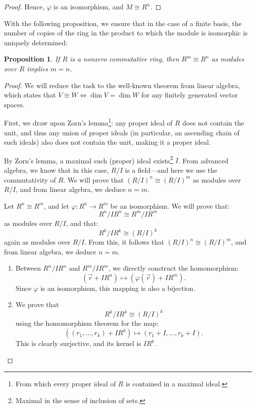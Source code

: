 \documentclass{article}
\newif\ifusemulticols
\theoremstyle{definition}
\theoremstyle{remark}
\theoremstyle{plain}
\theoremstyle{plain}
\newtheorem{prop}[theorem]{Proposition}
\newenvironment{mymulticols}
    { \ifusemulticols \begin{multicols}{2} \fi }
    { \ifusemulticols \end{multicols} \fi }
\begin{document}
\begin{mymulticols}
\begin{proof}
    Hence, $\varphi$ is an isomorphism, and $M \cong R^n$.
\end{proof}

With the following proposition, we ensure that in the case of a finite basis, the number of copies of the ring in the product to which the module is isomorphic is uniquely determined:

\begin{prop}
    \label{prop:commut_rank}
    If $R$ is a nonzero commutative ring, then $R^m \cong R^n$ as modules over $R$ implies $m = n$.
\end{prop}
\begin{proof}
    We will reduce the task to the well-known theorem from linear algebra, which states that $V
    \cong W \Leftrightarrow \dim V = \dim W$ for any finitely generated vector spaces.

    First, we draw upon Zorn's lemma\footnote{From which every proper ideal of $R$ is contained in a
    maximal ideal.}: any proper ideal of $R$ does not contain the unit, and thus any union of proper
    ideals (in particular, an ascending chain of such ideals) also does not contain the unit, making
    it a proper ideal.

    By Zorn's lemma, a maximal such (proper) ideal exists\footnote{Maximal in the sense of inclusion
    of sets.} $I$.
    From advanced algebra, we know that in this case, $R / I$ is a field—and here we use the
    commutativity of $R$.
    We will prove that $(R / I)^n \cong (R / I)^m$ as modules over $R / I$, and from linear algebra, we deduce $n = m$.

    Let $R^n \cong R^m$, and let $\varphi : R^n \to R^m$ 
    be an isomorphism. We will prove that: $${R^n}/{IR^n} \cong {R^m}/{IR^m}$$
    as modules over $R / I$, and that: $${R^k}/{IR^k} \cong \left(R / I\right)^k$$
    again as modules over $R / I$. From this, it follows that $\left(R / I\right)^n \cong \left(R / I\right)^m$, and from linear algebra, we deduce $n = m$.
    \begin{enumerate}
        \item Between ${R^n}/{IR^n}$ and ${R^m}/{IR^m}$, we directly construct the homomorphism:
            $$(\vec{r} + IR^n) \mapsto (\varphi(\vec{r}) + IR^m).$$
            Since $\varphi$ is an isomorphism, this mapping is also a bijection.
        \item We prove that $${R^k}/{IR^k} \cong \left(R / I\right)^k$$ using the homomorphism
            theorem for the map: $$\left(\left(r_1, \ldots, r_k\right) + IR^k\right) \mapsto \left(r_1 + I, \ldots, r_k + I\right).$$
            This is clearly surjective, and its kernel is $IR^k$.
    \end{enumerate}


\end{proof}
\end{mymulticols}
\end{document}
